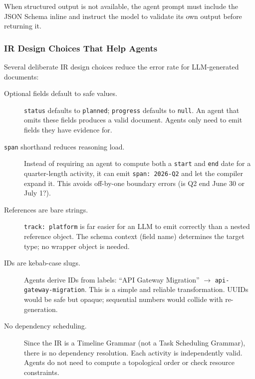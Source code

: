When structured output is not available, the agent prompt must include the JSON Schema
inline and instruct the model to validate its own output before returning it.

\subsubsection{IR Design Choices That Help Agents}
\label{sec:ir-agent-friendly}

Several deliberate IR design choices reduce the error rate for LLM-generated documents:

\begin{description}
  \item[Optional fields default to safe values.] \texttt{status} defaults to
        \texttt{planned}; \texttt{progress} defaults to \texttt{null}. An agent that
        omits these fields produces a valid document. Agents only need to emit fields
        they have evidence for.

  \item[\texttt{span} shorthand reduces reasoning load.] Instead of requiring an agent
        to compute both a \texttt{start} and \texttt{end} date for a quarter-length
        activity, it can emit \texttt{span: 2026-Q2} and let the compiler expand it.
        This avoids off-by-one boundary errors (is Q2 end June 30 or July 1?).

  \item[References are bare strings.] \texttt{track: platform} is far easier for an
        LLM to emit correctly than a nested reference object. The schema context (field
        name) determines the target type; no wrapper object is needed.

  \item[IDs are kebab-case slugs.] Agents derive IDs from labels:
        ``API Gateway Migration'' $\to$ \texttt{api-gateway-migration}. This is a
        simple and reliable transformation. UUIDs would be safe but opaque; sequential
        numbers would collide with re-generation.

  \item[No dependency scheduling.] Since the IR is a Timeline Grammar (not a Task
        Scheduling Grammar), there is no dependency resolution. Each activity is
        independently valid. Agents do not need to compute a topological order or
        check resource constraints.
\end{description}


